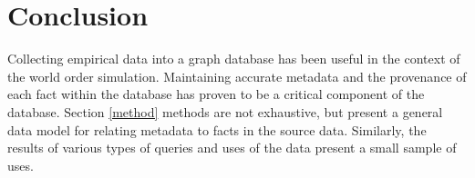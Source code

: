 \documentclass[runningheads]{llncs}
\begin{document}
\section{Conclusion\label{conclusion}} 
Collecting empirical data into a graph database has been useful in the context of the world order simulation.
Maintaining accurate metadata and the provenance of each fact within the database has proven to be a critical component of the database.
Section \ref{method} methods are not exhaustive, but present a general data model for relating metadata to facts in the source data.
Similarly, the results of various types of queries and uses of the data present a small sample of uses.

%
%


%
%
%
% 
% 
%
\end{document}
